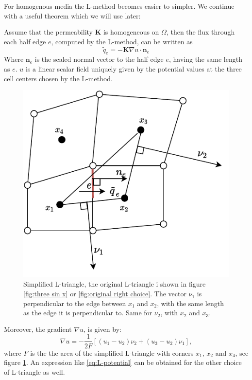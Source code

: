 \documentclass[../Main/main.tex]{subfiles}
\begin{document}
	\par 
	For homogenous media the L-method becomes easier to simpler. We continue with a useful theorem which we will use later:
	\begin{lemma} \label{lemma:L_potential}
		Assume that the permeability $\bm{K}$ is homogeneous on $\Omega$, then the flux through each half edge $e$, computed by the L-method, can be written as
		\begin{equation}\label{eq:L flux simplified}
			\tilde{q}_e = -\bm{K} \nabla u \cdot \bm{n}_e
		\end{equation}
		Where $\bm{n}_e$ is the scaled normal vector to the half edge $e$, having the same length as $e$. $u$ is a linear scalar field uniquely given by the potential values at the three cell centers chosen by the L-method.
		\begin{figure}[H]
			\centering
			\includegraphics{Right choice linear potential.pdf}
			\caption{Simplified L-triangle, the original L-triangle i shown in figure \ref{fig:three sin x} or \ref{fig:original right choice}. The vector $\nu_1$ is perpendicular to the edge between $x_1$ and $x_2$, with the same length as the edge it is perpendicular to. Same for $\nu_2$, with $x_2$ and $x_3$.}
			\label{fig:L-triangle-potential}
		\end{figure}
		Moreover, the gradient $\nabla u$, is given by:
		\begin{equation}\label{eq:L-potential}
			\nabla u = -\frac{1}{2F}[(u_1 - u_2)\nu_2 + (u_3 - u_2)\nu_1 ],
		\end{equation}
		where $F$ is the the area of the simplified L-triangle with corners $x_1$, $x_2$ and $x_4$, see figure  \ref{fig:L-triangle-potential}. An expression like \eqref{eq:L-potential} can be obtained for the other choice of L-triangle as well.
	\end{lemma}
\end{document}
